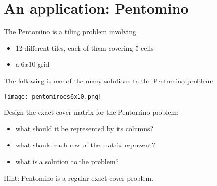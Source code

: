 \documentclass[table]{article}
\begin{document}
\vspace{1em}

\section{An application: Pentomino}

The Pentomino is a tiling problem involving
\begin{itemize}
\item 12 different tiles, each of them covering 5 cells
\item a $6x10$ grid
\end{itemize}

The following is one of the many solutions to the Pentomino problem:
\vspace{1em}

\begin{center}
\texttt{[image: pentominoes6x10.png]}
\end{center}

\vspace{1em}

Design the exact cover matrix for the Pentomino problem:
\begin{itemize}
	\item what should it be represented by its columns?
	\item what should each row of the matrix represent?
	\item what is a solution to the problem?
\end{itemize}

Hint: Pentomino is a regular exact cover problem.
\end{document}
